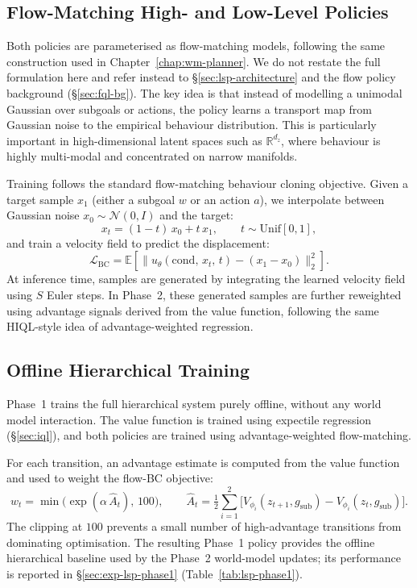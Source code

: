 \subsection{Flow-Matching High- and Low-Level Policies}
\label{sec:lsp-flow}

Both policies are parameterised as flow-matching models, following the same construction used in Chapter~\ref{chap:wm-planner}. We do not restate the full formulation here and refer instead to \S\ref{sec:lsp-architecture} and the flow policy background (\S\ref{sec:fql-bg}).
The key idea is that instead of modelling a unimodal Gaussian over subgoals or actions, the policy learns a transport map from Gaussian noise to the empirical behaviour distribution. This is particularly important in high-dimensional latent spaces such as $\mathbb{R}^{d_z}$, where behaviour is highly multi-modal and concentrated on narrow manifolds.

Training follows the standard flow-matching behaviour cloning objective. Given a target sample $x_1$ (either a subgoal $w$ or an action $a$), we interpolate between Gaussian noise $x_0 \sim \mathcal{N}(0, I)$ and the target:
\begin{equation}
x_t = (1-t)\,x_0 + t\,x_1, \qquad t \sim \mathrm{Unif}[0,1],
\end{equation}
and train a velocity field to predict the displacement:
\begin{equation}
\mathcal{L}_{\mathrm{BC}}
= \mathbb{E}\!\left[
\|u_\theta(\mathrm{cond},\,x_t,\,t) - (x_1 - x_0)\|_2^2
\right].
\label{eq:lsp-bc}
\end{equation}
At inference time, samples are generated by integrating the learned velocity field using $S$ Euler steps. In Phase~2, these generated samples are further reweighted using advantage signals derived from the value function, following the same HIQL-style idea of advantage-weighted regression.

\subsection{Offline Hierarchical Training}
\label{sec:lsp-phase1}

Phase~1 trains the full hierarchical system purely offline, without any world model interaction. The value function is trained using expectile regression (\S\ref{sec:iql}), and both policies are trained using advantage-weighted flow-matching.

For each transition, an advantage estimate is computed from the value function and used to weight the flow-BC objective:
\begin{equation}
w_t = \min\!\bigl(\exp(\alpha\,\hat{A}_t),\,100\bigr),
\qquad
\hat{A}_t = \tfrac{1}{2}\sum_{i=1}^{2}
\bigl[
V_{\phi_i}(z_{t+1}, g_{\mathrm{sub}}) - V_{\phi_i}(z_t, g_{\mathrm{sub}})
\bigr].
\end{equation}
The clipping at $100$ prevents a small number of high-advantage transitions from dominating optimisation. The resulting Phase~1 policy provides the offline hierarchical baseline used by the Phase~2 world-model updates; its performance is reported in \S\ref{sec:exp-lsp-phase1} (Table~\ref{tab:lsp-phase1}).

